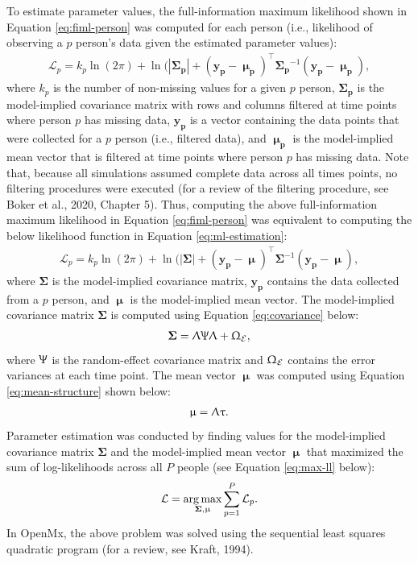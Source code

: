 \documentclass[
12pt, %
twoside,
english]{guelphthesis}
\theoremstyle{definition}
\theoremstyle{definition}
\theoremstyle{definition}
\theoremstyle{definition}
\theoremstyle{remark}
\begin{document}
To estimate parameter values, the full-information maximum
likelihood shown in Equation \ref{eq:fiml-person} was computed for each
person (i.e., likelihood of observing a \(p\) person's data given the
estimated parameter values):
\begin{align}
\mathcal{L}_p = k_p \ln(2\pi) + \ln(|\mathbf{\Sigma_p}| + (\mathbf{y_p} - \mathbf{\upmu_p})^\top \mathbf{\Sigma_p}^{-1}(\mathbf{y_p} - \mathbf{\upmu_p}),
\label{eq:fiml-person}
\end{align}
\noindent where \(k_p\) is the number of non-missing values for a given
\(p\) person, \(\mathbf{\Sigma_p}\) is the model-implied covariance matrix
with rows and columns filtered at time points where person \(p\) has
missing data, \(\mathbf{y_p}\) is a vector containing the data points that
were collected for a \(p\) person (i.e., filtered data), and
\(\mathbf{\upmu_p}\) is the model-implied mean vector that is filtered at
time points where person \(p\) has missing data. Note that, because all
simulations assumed complete data across all times points, no filtering
procedures were executed (for a review of the filtering procedure, see Boker et al., 2020, Chapter 5). Thus, computing the above full-information
maximum likelihood in Equation \ref{eq:fiml-person} was equivalent to
computing the below likelihood function in Equation
\ref{eq:ml-estimation}:
\begin{align}
\mathcal{L}_p = k_p \ln(2\pi) + \ln(|\mathbf{\Sigma}| + (\mathbf{y_p} - \mathbf{\upmu})^\top \mathbf{\Sigma}^{-1}(\mathbf{y_p} - \mathbf{\upmu}),  
\label{eq:ml-estimation}
\end{align}
\noindent where \(\mathbf{\Sigma}\) is the model-implied covariance matrix,
\(\mathbf{y_p}\) contains the data collected from a \(p\) person, and
\(\mathbf{\upmu}\) is the model-implied mean vector. The model-implied
covariance matrix \(\mathbf{\Sigma}\) is computed using Equation
\ref{eq:covariance} below:
\begin{align}
\mathbf{\Sigma} = \mathbf{\Uplambda\Uppsi\Uplambda} + \mathbf{\Upomega}_{\mathcal{E}},   
\label{eq:covariance}
\end{align}
\noindent where \(\mathbf{\Uppsi}\) is the random-effect covariance matrix
and \(\mathbf{\Upomega}_{\mathcal{E}}\) contains the error variances at
each time point. The mean vector \(\mathbf{\upmu}\) was computed using
Equation \ref{eq:mean-structure} shown below:
\begin{align}
\mathbf{\upmu} = \mathbf{\Uplambda\uptau}. 
\label{eq:mean-structure}
\end{align}
\noindent Parameter estimation was conducted by finding values for the model-implied
covariance matrix \(\mathbf{\Sigma}\) and the model-implied mean vector
\(\mathbf{\upmu}\) that maximized the sum of log-likelihoods across all \(P\) people
(see Equation \ref{eq:max-ll} below):
\begin{align}
\mathcal{L} = \underset{\mathbf{\Sigma},\mathbf{\upmu} }{\operatorname*{arg\,max}} \sum^P_{p = 1} \mathcal{L}_p.
\label{eq:max-ll}
\end{align}
\noindent In OpenMx, the above problem was solved using the sequential
least squares quadratic program (for a review, see Kraft, 1994).
\end{document}
